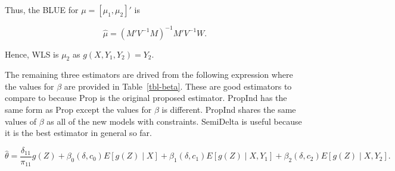 \documentclass[
  letterpaper,
  DIV=11,
  numbers=noendperiod]{scrartcl}
\begin{document}
Thus, the BLUE for \(\mu = [\mu_1, \mu_2]'\) is

\[\hat \mu = (M' V^{-1} M)^{-1} M' V^{-1} W.\]

Hence, WLS is \(\mu_2\) as \(g(X, Y_1, Y_2) = Y_2\).

The remaining three estimators are drived from the following expression
where the values for \(\beta\) are provided in Table~\ref{tbl-beta}.
These are good estimators to compare to because Prop is the original
proposed estimator. PropInd has the same form as Prop except the values
for \(\beta\) is different. PropInd shares the same values of \(\beta\)
as all of the new models with constraints. SemiDelta is useful because
it is the best estimator in general so far.

\[
\hat \theta = \frac{\delta_{11}}{\pi_{11}}g(Z) + 
\beta_0(\delta, c_0)E[g(Z) \mid X] + 
\beta_1(\delta, c_1)E[g(Z) \mid X, Y_1] + 
\beta_2(\delta, c_2) E[g(Z)
\mid X, Y_2].
\]
\end{document}
